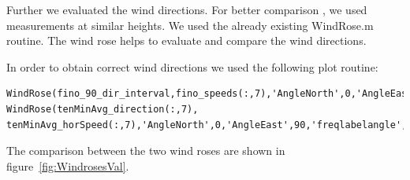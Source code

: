 \documentclass[10pt]{article}
\begin{document}
Further we evaluated the wind directions. For better comparison , we used measurements at similar heights. We used the already existing WindRose.m routine. The wind rose helps to evaluate and compare the wind directions.

In order to obtain correct wind directions we used the following plot routine:\\
\begin{lstlisting}
WindRose(fino_90_dir_interval,fino_speeds(:,7),'AngleNorth',0,'AngleEast',90,'freqlabelangle',45,'MaxFrequency',6);
WindRose(tenMinAvg_direction(:,7), tenMinAvg_horSpeed(:,7),'AngleNorth',0,'AngleEast',90,'freqlabelangle',45,'MaxFrequency',6);
\end{lstlisting}

The comparison between the two wind roses are shown in figure~\ref{fig:WindrosesVal}. 
\end{document}

